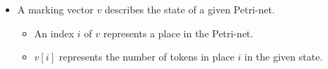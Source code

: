 \documentclass{article}
\begin{document}
\vspace{1em}

\begin{itemize}
	\item A marking vector $v$ describes the state of a given Petri-net.
	\begin{itemize}
		\item An index $i$ of $v$ represents a place in the Petri-net.
		\item $v[i]$ represents the number of tokens in place $i$ in the given state.
	\end{itemize}
\end{itemize}

\ifdefined\iscombined
	\newpage
\else
	
\end{document}
